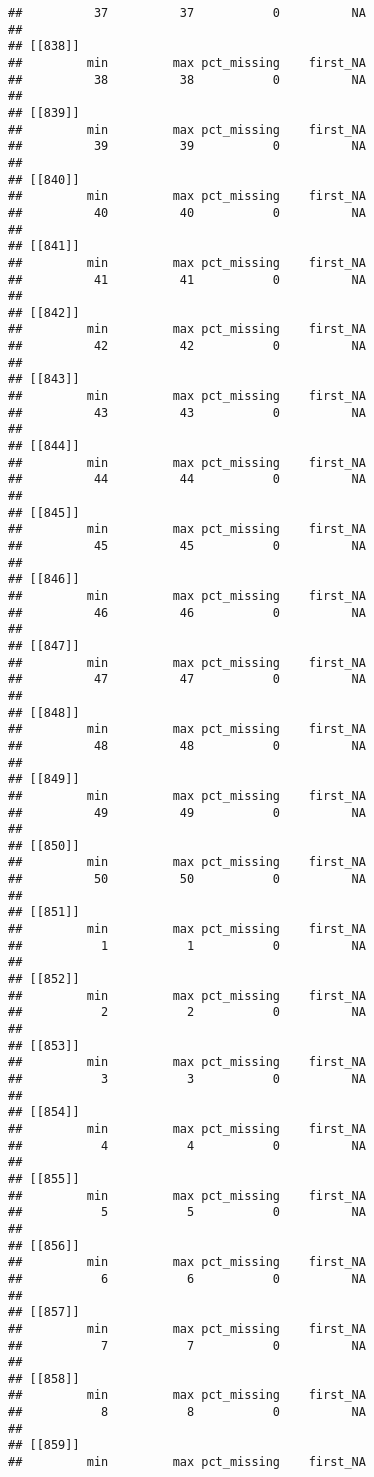 \documentclass[
]{article}
\begin{document}
\begin{verbatim}
##          37          37           0          NA 
## 
## [[838]]
##         min         max pct_missing    first_NA 
##          38          38           0          NA 
## 
## [[839]]
##         min         max pct_missing    first_NA 
##          39          39           0          NA 
## 
## [[840]]
##         min         max pct_missing    first_NA 
##          40          40           0          NA 
## 
## [[841]]
##         min         max pct_missing    first_NA 
##          41          41           0          NA 
## 
## [[842]]
##         min         max pct_missing    first_NA 
##          42          42           0          NA 
## 
## [[843]]
##         min         max pct_missing    first_NA 
##          43          43           0          NA 
## 
## [[844]]
##         min         max pct_missing    first_NA 
##          44          44           0          NA 
## 
## [[845]]
##         min         max pct_missing    first_NA 
##          45          45           0          NA 
## 
## [[846]]
##         min         max pct_missing    first_NA 
##          46          46           0          NA 
## 
## [[847]]
##         min         max pct_missing    first_NA 
##          47          47           0          NA 
## 
## [[848]]
##         min         max pct_missing    first_NA 
##          48          48           0          NA 
## 
## [[849]]
##         min         max pct_missing    first_NA 
##          49          49           0          NA 
## 
## [[850]]
##         min         max pct_missing    first_NA 
##          50          50           0          NA 
## 
## [[851]]
##         min         max pct_missing    first_NA 
##           1           1           0          NA 
## 
## [[852]]
##         min         max pct_missing    first_NA 
##           2           2           0          NA 
## 
## [[853]]
##         min         max pct_missing    first_NA 
##           3           3           0          NA 
## 
## [[854]]
##         min         max pct_missing    first_NA 
##           4           4           0          NA 
## 
## [[855]]
##         min         max pct_missing    first_NA 
##           5           5           0          NA 
## 
## [[856]]
##         min         max pct_missing    first_NA 
##           6           6           0          NA 
## 
## [[857]]
##         min         max pct_missing    first_NA 
##           7           7           0          NA 
## 
## [[858]]
##         min         max pct_missing    first_NA 
##           8           8           0          NA 
## 
## [[859]]
##         min         max pct_missing    first_NA 

\end{verbatim}
\end{document}
